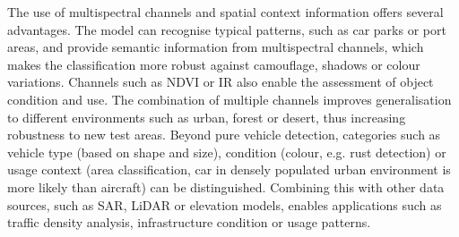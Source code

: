 The use of multispectral channels and spatial context information offers several advantages. The model can recognise typical patterns, such as car parks or port areas, and provide semantic information from multispectral channels, which makes the classification more robust against camouflage, shadows or colour variations. Channels such as \acrshort{NDVI} or \acrshort{IR} also enable the assessment of object condition and use. The combination of multiple channels improves generalisation to different environments such as urban, forest or desert, thus increasing robustness to new test areas. Beyond pure vehicle detection, categories such as vehicle type (based on shape and size), condition (colour, e.g. rust detection) or usage context (area classification, car in densely populated urban environment is more likely than aircraft) can be distinguished. Combining this with other data sources, such as \acrshort{SAR}, \acrshort{LiDAR} or elevation models, enables applications such as traffic density analysis, infrastructure condition or usage patterns.



